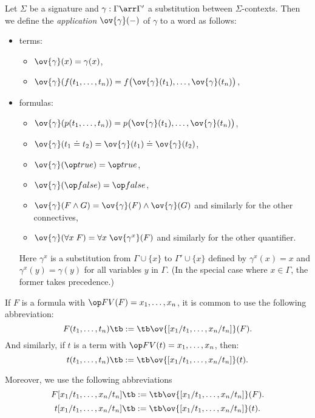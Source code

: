 \begin{definition}\label{def:fol:subapp}
Let $\Sigma$ be a signature and $\gamma:\Gamma\arr\Gamma'$ a substitution between $\Sigma$-contexts. Then we define the \emph{application} $\ov{\gamma}(-)$ of $\gamma$ to a word as follows:
\begin{itemize}
\item terms:
  \begin{itemize}
    \item $\ov{\gamma}(x)=\gamma(x)$,
     \item $\ov{\gamma}(f(t_1,\ldots,t_n))=f\big(\ov{\gamma}(t_1),\ldots,\ov{\gamma}(t_n)\big)$,
  \end{itemize}
\item formulas:
   \begin{itemize}
     \item $\ov{\gamma}(p(t_1,\ldots,t_n))=p\big(\ov{\gamma}(t_1),\ldots,\ov{\gamma}(t_n)\big)$,
     \item $\ov{\gamma}(t_1\doteq t_2)=\ov{\gamma}(t_1)\doteq\ov{\gamma}(t_2)$,
     \item $\ov{\gamma}(\true)=\true$,
     \item $\ov{\gamma}(\false)=\false$,
     \item $\ov{\gamma}(F\wedge G)=\ov{\gamma}(F)\wedge\ov{\gamma}(G)$ and similarly for the other connectives,
     \item $\ov{\gamma}(\forall x\;F)=\forall x\;\ov{\gamma^x}(F)$ and similarly for the other quantifier.
   \end{itemize}
   Here $\gamma^x$ is a substitution from $\Gamma\cup\{x\}$ to $\Gamma'\cup\{x\}$ defined by $\gamma^x(x)=x$ and $\gamma^x(y)=\gamma(y)$ for all variables $y$ in $\Gamma$. (In the special case where $x\in\Gamma$, the former takes precedence.)
\end{itemize}
\end{definition}

\begin{notation}\label{not:fol:sub}
If $F$ is a formula with $\FV(F)=x_1,\ldots,x_n$, it is common to use the following abbreviation:
\[F(t_1,\ldots,t_n) \tb := \tb \ov{[\sub{x_1}{t_1},\ldots,\sub{x_n}{t_n}]}(F).\]
And similarly, if $t$ is a term with $\FV(t)=x_1,\ldots,x_n$, then:
\[t(t_1,\ldots,t_n) \tb := \tb \ov{[\sub{x_1}{t_1},\ldots,\sub{x_n}{t_n}]}(t).\]

Moreover, we use the following abbreviations
\[F[\sub{x_1}{t_1},\ldots,\sub{x_n}{t_n}] \tb := \tb \ov{[\sub{x_1}{t_1},\ldots,\sub{x_n}{t_n}]}(F).\]
\[t[\sub{x_1}{t_1},\ldots,\sub{x_n}{t_n}] \tb := \tb \ov{[\sub{x_1}{t_1},\ldots,\sub{x_n}{t_n}]}(t).\]
\end{notation}

